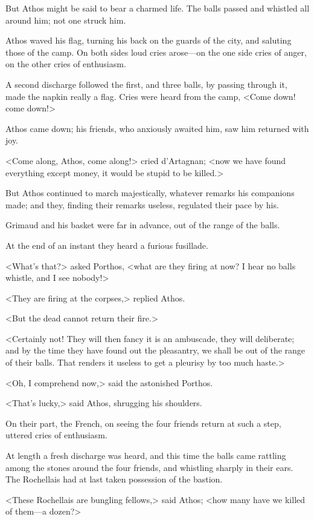 But Athos might be said to bear a charmed life. The balls passed and whistled all around him; not one struck him. 

Athos waved his flag, turning his back on the guards of the city, and saluting those of the camp. On both sides loud cries arose---on the one side cries of anger, on the other cries of enthusiasm. 

A second discharge followed the first, and three balls, by passing through it, made the napkin really a flag. Cries were heard from the camp, <Come down! come down!> 

Athos came down; his friends, who anxiously awaited him, saw him returned with joy. 

<Come along, Athos, come along!> cried d'Artagnan; <now we have found everything except money, it would be stupid to be killed.> 

But Athos continued to march majestically, whatever remarks his companions made; and they, finding their remarks useless, regulated their pace by his. 

Grimaud and his basket were far in advance, out of the range of the balls. 

At the end of an instant they heard a furious fusillade. 

<What's that?> asked Porthos, <what are they firing at now? I hear no balls whistle, and I see nobody!> 

<They are firing at the corpses,> replied Athos. 

<But the dead cannot return their fire.> 

<Certainly not! They will then fancy it is an ambuscade, they will deliberate; and by the time they have found out the pleasantry, we shall be out of the range of their balls. That renders it useless to get a pleurisy by too much haste.> 

<Oh, I comprehend now,> said the astonished Porthos. 

<That's lucky,> said Athos, shrugging his shoulders. 

On their part, the French, on seeing the four friends return at such a step, uttered cries of enthusiasm. 

At length a fresh discharge was heard, and this time the balls came rattling among the stones around the four friends, and whistling sharply in their ears. The Rochellais had at last taken possession of the bastion. 

<These Rochellais are bungling fellows,> said Athos; <how many have we killed of them---a dozen?> 

